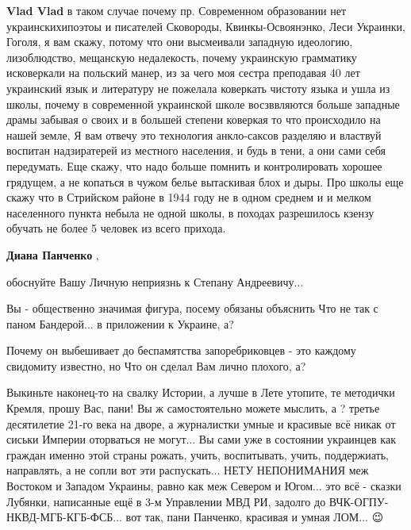 \begin{itemize}
\begin{itemize}
\textbf{Vlad Vlad} в таком случае почему пр. Современном образовании нет
украинскихипоэтоы и писателей Сковороды, Квинкы-Освоянэнко, Леси Украинки,
Гоголя, я вам скажу, потому что они высмеивали западную идеологию,
лизоблюдство, мещанскую недалекость, почему украинскую грамматику исковеркали
на польский манер, из за чего моя сестра преподавая 40 лет украинский язык и
литературу не пожелала коверкать чистоту языка и ушла из школы, почему в
современной украинской школе восзввляются больше западные драмы забывая о своих
и в большей степени коверкая то что происходило на нашей земле, Я вам отвечу
это технология анкло-саксов разделяю и властвуй воспитан надзиратерей из
местного населения, и будь в тени, а они сами себя передумать. Еще скажу, что
надо больше помнить и контролировать хорошее грядущем, а не копаться в чужом
белье вытаскивая блох и дыры. Про школы еще скажу что в Стрийском районе в 1944
году не в одном среднем и и мелком населенного пункта небыла не одной школы, в
походах разрешилось кзензу обучать не более 5 человек из всего прихода.

 
\textbf{Диана Панченко} , 

обоснуйте Вашу Личную неприязнь к Степану Андреевичу...

Вы - общественно значимая фигура, посему обязаны объяснить Что не так с паном
Бандерой... в приложении к Украине, а?

Почему он выбешивает до беспамятства запоребриковцев - это каждому свидомиту
известно, но Что он сделал Вам лично плохого, а?

Выкиньте наконец-то на свалку Истории, а лучше в Лете утопите, те методички
Кремля, прошу Вас, пани! Вы ж самостоятельно можете мыслить, а ? третье
десятилетие 21-го века на дворе, а журналистки умные и красивые всё никак от
сиськи Империи оторваться не могут... Вы сами уже в состоянии украинцев как
граждан именно этой страны рожать, учить, воспитывать, учить, поддержиать,
направлять, а не сопли вот эти распускать... НЕТУ НЕПОНИМАНИЯ меж Востоком и
Западом Украины, равно как меж Севером и Югом... это всё - сказки Лубянки,
написанные ещё в 3-м Управлении МВД РИ, задолго до ВЧК-ОГПУ-НКВД-МГБ-КГБ-ФСБ...
вот так, пани Панченко, красивая и умная ЛОМ... 😉

 

\end{itemize}
\end{itemize}
